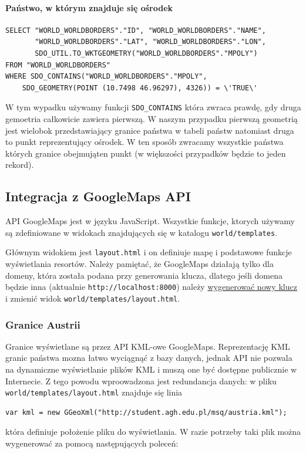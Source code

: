 \documentclass[12pt]{article}
\begin{document}
\paragraph{Państwo, w którym znajduje się ośrodek}
\begin{verbatim}
SELECT "WORLD_WORLDBORDERS"."ID", "WORLD_WORLDBORDERS"."NAME",
       "WORLD_WORLDBORDERS"."LAT", "WORLD_WORLDBORDERS"."LON",
       SDO_UTIL.TO_WKTGEOMETRY("WORLD_WORLDBORDERS"."MPOLY")
FROM "WORLD_WORLDBORDERS"
WHERE SDO_CONTAINS("WORLD_WORLDBORDERS"."MPOLY",
    SDO_GEOMETRY(POINT (10.7498 46.96297), 4326)) = \'TRUE\'
\end{verbatim}
W tym wypadku używamy funkcji \texttt{SDO\_CONTAINS} która zwraca prawdę, gdy druga gemoetria całkowicie zawiera pierwszą.
W naszym przypadku pierwszą geometrią jest wielobok przedstawiający granice państwa w tabeli państw natomiast druga to
punkt reprezentujący ośrodek. W ten sposób zwracamy wszystkie państwa których granice obejmująten punkt (w większości
przypadków będzie to jeden rekord).

\subsection{Integracja z GoogleMaps API}
API GoogleMaps jest w języku JavaScript. Wszystkie funkcje, ktorych używamy są zdefiniowane w widokach znajdujących
się w katalogu \texttt{world/templates}.

Głównym widokiem jest \texttt{layout.html} i on definiuje mapę i podstawowe funkcje wyświetlania resortów. Należy pamiętać,
że GoogleMaps działają tylko dla domeny, która została podana przy generowania klucza, dlatego jeśli domena będzie inna
(aktualnie \texttt{http://localhost:8000}) należy \href{http://code.google.com/apis/maps/signup.html}{wygenerować nowy klucz}
i zmienić widok \texttt{world/templates/layout.html}.

\subsubsection{Granice Austrii}
Granice wyświetlane są przez API KML-owe GoogleMaps. Reprezentację KML granic państwa mozna łatwo wyciągnąć z bazy
danych, jednak API nie pozwala na dynamiczne wyświetlanie plików KML i muszą one być dostępne publicznie w Internecie.
Z tego powodu wproowadzona jest redundancja danych: w pliku \texttt{world/templates/layout.html} znajduje się linia
\begin{verbatim}
var kml = new GGeoXml("http://student.agh.edu.pl/msq/austria.kml");
\end{verbatim}
która definiuje położenie pliku do wyświetlania. W razie potrzeby taki plik można wygenerować za pomocą następujących
poleceń:
\end{document}
